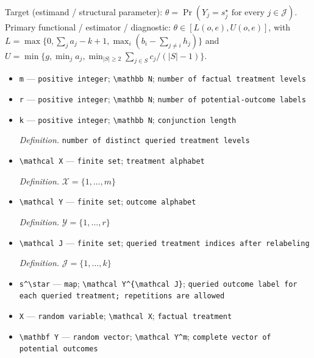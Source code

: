 \documentclass{article}
\begin{document}
Target (estimand / structural parameter): \(\theta=\Pr(Y_j=s_j^\star\text{ for every }j\in\mathcal J)\).
Primary functional / estimator / diagnostic: \(\theta\in[L(o,e),U(o,e)]\), with \(L=\max\{0,\sum_j a_j-k+1,\max_i(b_i-\sum_{j\neq i}h_j)\}\) and \(U=\min\{g,\min_j a_j,\min_{|S|\geq2}\sum_{j\in S}c_j/(|S|-1)\}\).
\begin{itemize}
  \item \texttt{m} --- \texttt{positive integer}; \texttt{\textbackslash{}\allowbreak{}mathbb N}; \texttt{number of factual treatment levels}
  \item \texttt{r} --- \texttt{positive integer}; \texttt{\textbackslash{}\allowbreak{}mathbb N}; \texttt{number of potential-\allowbreak{}outcome labels}
  \item \texttt{k} --- \texttt{positive integer}; \texttt{\textbackslash{}\allowbreak{}mathbb N}; \texttt{conjunction length}
  \par\smallskip\noindent\emph{Definition.} \texttt{number of distinct queried treatment levels}
  \item \texttt{\textbackslash{}\allowbreak{}mathcal X} --- \texttt{finite set}; \texttt{treatment alphabet}
  \par\smallskip\noindent\emph{Definition.} \(\mathcal X=\{1,\ldots,m\}\)
  \item \texttt{\textbackslash{}\allowbreak{}mathcal Y} --- \texttt{finite set}; \texttt{outcome alphabet}
  \par\smallskip\noindent\emph{Definition.} \(\mathcal Y=\{1,\ldots,r\}\)
  \item \texttt{\textbackslash{}\allowbreak{}mathcal J} --- \texttt{finite set}; \texttt{queried treatment indices after relabeling}
  \par\smallskip\noindent\emph{Definition.} \(\mathcal J=\{1,\ldots,k\}\)
  \item \texttt{s\textasciicircum{}\textbackslash{}\allowbreak{}star} --- \texttt{map}; \texttt{\textbackslash{}\allowbreak{}mathcal Y\textasciicircum{}\{\textbackslash{}\allowbreak{}mathcal J\}\allowbreak{}}; \texttt{queried outcome label for each queried treatment;\allowbreak{} repetitions are allowed}
  \item \texttt{X} --- \texttt{random variable}; \texttt{\textbackslash{}\allowbreak{}mathcal X}; \texttt{factual treatment}
  \item \texttt{\textbackslash{}\allowbreak{}mathbf Y} --- \texttt{random vector}; \texttt{\textbackslash{}\allowbreak{}mathcal Y\textasciicircum{}m}; \texttt{complete vector of potential outcomes}

\end{itemize}
\end{document}
